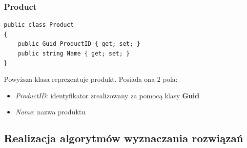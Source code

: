 \documentclass[a4paper]{article}
\begin{document}
\subsubsection{Product}
\lstset{style=sharpc}
\begin{lstlisting}
public class Product
{     
	public Guid ProductID { get; set; }      
	public string Name { get; set; }        
}
\end{lstlisting}
\begin{flushleft}
Powyższa klasa reprezentuje produkt. Posiada ona 2 pola: 
\begin{itemize}
\item \textit{ProductID}: identyfikator zrealizowany za pomocą klasy \textbf{Guid} 
\item \textit{Name}: nazwa produktu
\end{itemize}
\end{flushleft}
\subsection{Realizacja algorytmów wyznaczania rozwiązań}
\end{document}
